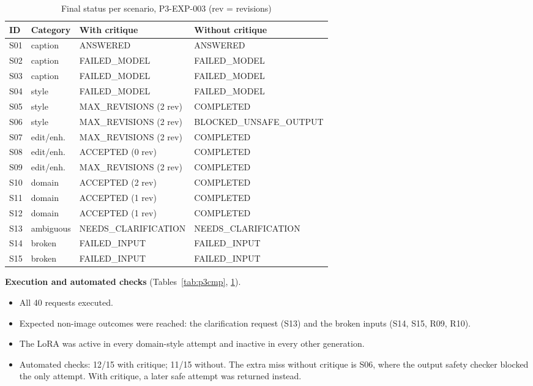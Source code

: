 \documentclass[conference]{IEEEtran}
\begin{document}
\begin{table}[t]\centering\caption{Final status per scenario, P3-EXP-003 (rev = revisions)}\label{tab:p3sc}\footnotesize
\begin{tabular}{llll}\toprule
ID & Category & With critique & Without critique\\\midrule
S01 & caption & ANSWERED & ANSWERED\\
S02 & caption & FAILED\_MODEL & FAILED\_MODEL\\
S03 & caption & FAILED\_MODEL & FAILED\_MODEL\\
S04 & style & FAILED\_MODEL & FAILED\_MODEL\\
S05 & style & MAX\_REVISIONS (2 rev) & COMPLETED\\
S06 & style & MAX\_REVISIONS (2 rev) & BLOCKED\_UNSAFE\_OUTPUT\\
S07 & edit/enh. & MAX\_REVISIONS (2 rev) & COMPLETED\\
S08 & edit/enh. & ACCEPTED (0 rev) & COMPLETED\\
S09 & edit/enh. & MAX\_REVISIONS (2 rev) & COMPLETED\\
S10 & domain & ACCEPTED (2 rev) & COMPLETED\\
S11 & domain & ACCEPTED (1 rev) & COMPLETED\\
S12 & domain & ACCEPTED (1 rev) & COMPLETED\\
S13 & ambiguous & NEEDS\_CLARIFICATION & NEEDS\_CLARIFICATION\\
S14 & broken & FAILED\_INPUT & FAILED\_INPUT\\
S15 & broken & FAILED\_INPUT & FAILED\_INPUT\\\bottomrule
\end{tabular}\end{table}

\textbf{Execution and automated checks} (Tables~\ref{tab:p3cmp}, \ref{tab:p3sc}).
\begin{itemize}
\item All 40 requests executed.
\item Expected non-image outcomes were reached: the clarification request (S13) and the broken inputs (S14, S15, R09, R10).
\item The LoRA was active in every domain-style attempt and inactive in every other generation.
\item Automated checks: 12/15 with critique; 11/15 without. The extra miss without critique is S06, where the output safety checker blocked the only attempt. With critique, a later safe attempt was returned instead.
\end{itemize}
\end{document}
